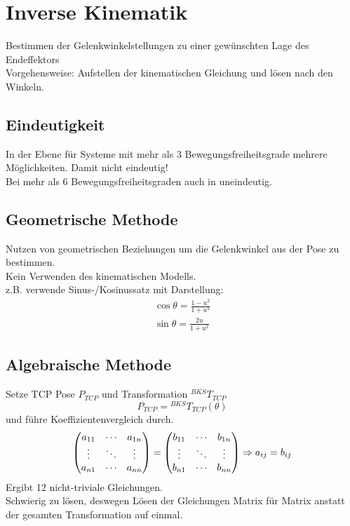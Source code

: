 

\section{Inverse Kinematik}%
\label{ik:sec:inverse-kinematik}
Bestimmen der Gelenkwinkelstellungen zu einer gewünschten Lage des Endeffektors\\
Vorgehensweise: Aufstellen der kinematischen Gleichung und lösen nach den Winkeln.

\subsection{Eindeutigkeit}%
\label{ik:sub:eindeutigkeit}
In der Ebene für Systeme mit mehr als 3 Bewegungsfreiheitsgrade mehrere Möglichkeiten. Damit nicht eindeutig!\\
Bei mehr als 6 Bewegungsfreiheitsgraden auch in \SE uneindeutig.

\subsection{Geometrische Methode}%
\label{ik:sub:geometrische-methode}
Nutzen von geometrischen Beziehungen um die Gelenkwinkel aus der Pose zu bestimmen.\\
Kein Verwenden des kinematischen Modells.\\
z.B. verwende Sinus-/Kosinussatz mit Darstellung: 
\begin{align*}
  \cos \theta = \frac{1 - u^2}{1 + u^2}\\
  \sin \theta = \frac{2u}{1 + u^2}
\end{align*}

\subsection{Algebraische Methode}%
\label{ik:sub:algebraische-methode}
Setze TCP Pose \(P_{TCP}\) und Transformation \({}^{BKS}T_{TCP}\)
\[P_{TCP} = {}^{BKS}T_{TCP}(\theta)\]
und führe Koeffizientenvergleich durch.
\[\begin{pmatrix}a_{11} & \cdots & a_{1n}\\ \vdots & \ddots & \vdots \\ a_{n1} & \cdots & a_{nn} \end{pmatrix} =
  \begin{pmatrix}b_{11} & \cdots & b_{1n}\\ \vdots & \ddots & \vdots \\ b_{n1} & \cdots & b_{nn} \end{pmatrix} \Rightarrow a_{ij} = b_{ij}\]
Ergibt 12 nicht-triviale Gleichungen.\\
Schwierig zu lösen, deswegen Lösen der Gleichungen Matrix für Matrix anstatt der gesamten Transformation auf einmal.

